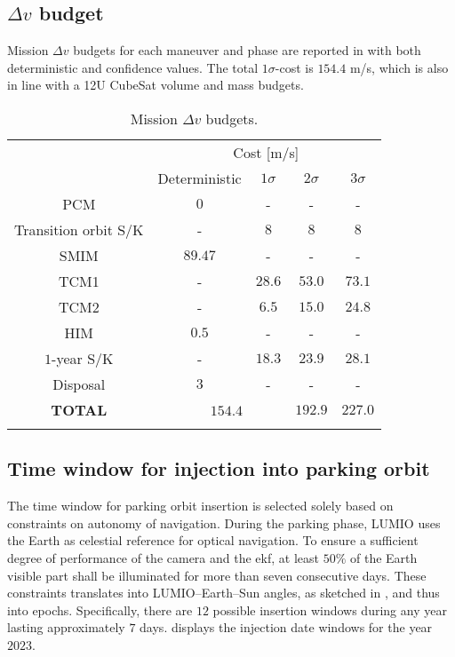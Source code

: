 \begin{figure*}[b!]
\subsection{$\Delta v$ budget}
\label{subsec:deltavbudget}
Mission $\Delta v$ budgets for each maneuver and phase are reported in  with both deterministic and confidence values. The total $1\sigma$-cost is $154.4$ m/s, which is also in line with a 12U CubeSat volume and mass  budgets.
%
\begin{table}[!h]
	\caption{Mission $\Delta v$ budgets.}
	\label{tab:MissiondvBudgets}
	\centering
	\begin{tabular}{ccc|cc}
		\TOPlines
		\multirow{2}{*}{Maneuver} & \multicolumn{4}{c}{Cost [m/s]} \\
		& Deterministic & $1\sigma$ & $2\sigma$ & $3\sigma$ \\
		\MIDline
		PCM               & $0$  & - & - & - \\
		Transition orbit S/K & - & $8$ & $8$ & $8$ \\
		SMIM              & $89.47$ & - & - & - \\
		TCM1              & - & $28.6$ & $53.0$ & $73.1$ \\
		TCM2              & - & $6.5$ & $15.0$ & $24.8$ \\
		HIM               & $0.5$ & - & - & - \\
		$1$-year S/K & - & $18.3$ & $23.9$ & $28.1$ \\
		Disposal          & $3$ & - & - & - \\
		\MIDline
		\textbf{TOTAL} & \multicolumn{2}{c}{\ \ $154.4$} & $192.9$ & $227.0$ \\
		\BOTTOMlines
	\end{tabular}
\end{table}
%

\subsection{Time window for injection into parking orbit}\label{subsec:Time window for injection into parking orbit}
The time window for parking orbit insertion is selected solely based on constraints on autonomy of navigation. During the parking phase, LUMIO uses the Earth as celestial reference for optical navigation. To ensure a sufficient degree of performance of the camera and the {ekf}, at least $50\%$ of the Earth visible part shall be illuminated for more than seven consecutive days. These constraints translates into LUMIO--Earth--Sun angles, as sketched in , and thus into epochs. Specifically, there are $12$ possible insertion windows during any year lasting approximately $7$ days.  displays the injection date windows for the year $2023$.


\end{figure*}
